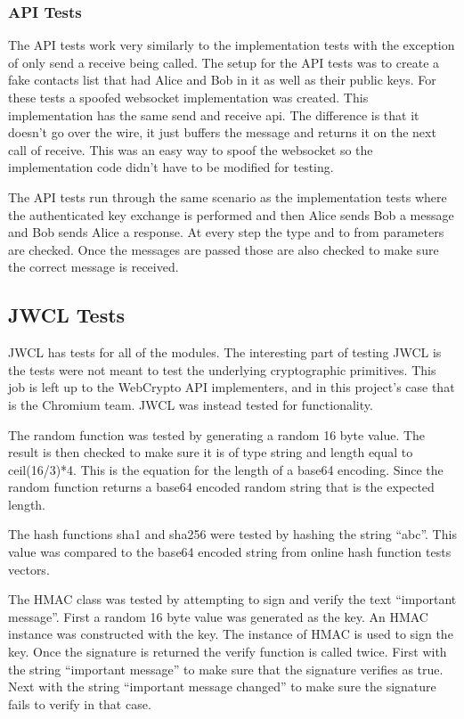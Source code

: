 \subsubsection{API Tests} 


The API tests work very similarly to the implementation tests with the exception of only send a receive being called. The setup for the API tests was to create a fake contacts list that had Alice and Bob in it as well as their public keys. For these tests a spoofed websocket implementation was created. This implementation has the same send and receive api. The difference is that it doesn’t go over the wire, it just buffers the message and returns it on the next call of receive. This was an easy way to spoof the websocket so the implementation code didn’t have to be modified for testing.


The API tests run through the same scenario as the implementation tests where the authenticated key exchange is performed and then Alice sends Bob a message and Bob sends Alice a response. At every step the type and to from parameters are checked. Once the messages are passed those are also checked to make sure the correct message is received.


\subsection{JWCL Tests}


JWCL has tests for all of the modules. The interesting part of testing JWCL is the tests were not meant to test the underlying cryptographic primitives. This job is left up to the WebCrypto API implementers, and in this project's case that is the Chromium team. JWCL was instead tested for functionality.


The random function was tested by generating a random 16 byte value. The result is then checked to make sure it is of type string and length equal to ceil(16/3)*4. This is the equation for the length of a base64 encoding. Since the random function returns a base64 encoded random string that is the expected length.


The hash functions sha1 and sha256 were tested by hashing the string “abc”. This value was compared to the base64 encoded string from online hash function tests vectors. \cite{test-vectors}


The HMAC class was tested by attempting to sign and verify the text “important message”. First a random 16 byte value was generated as the key. An HMAC instance was constructed with the key. The instance of HMAC is used to sign the key. Once the signature is returned the verify function is called twice. First with the string “important message” to make sure that the signature verifies as true. Next with the string “important message changed” to make sure the signature fails to verify in that case.


